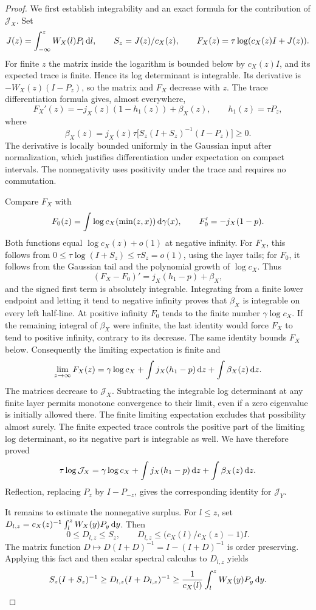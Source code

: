 \begin{proof}
We first establish integrability and an exact formula for the contribution of $\mathcal{J}_X$. Set
\[
J(z)=\int_{-\infty}^zW_X(l)P_l\,\mathrm{d} l,\qquad
S_z=J(z)/c_X(z),\qquad F_X(z)=\tau\log(c_X(z)I+J(z)).
\]
For finite $z$ the matrix inside the logarithm is bounded below by $c_X(z)I$, and its expected trace is finite. Hence its log determinant is integrable. Its derivative is $-W_X(z)(I-P_z)$, so the matrix and $F_X$ decrease with $z$. The trace differentiation formula gives, almost everywhere,
\[
F_X'(z)=-j_X(z)(1-h_1(z))+\beta_X(z),\qquad
h_1(z)=\tau P_z,
\]
where
\[
\beta_X(z)=j_X(z)\tau\bigl[S_z(I+S_z)^{-1}(I-P_z)\bigr]\ge0.
\]
The derivative is locally bounded uniformly in the Gaussian input after normalization, which justifies differentiation under expectation on compact intervals. The nonnegativity uses positivity under the trace and requires no commutation.

Compare $F_X$ with
\[
F_0(z)=\int\log c_X(\min(z,x))\,\mathrm{d} \gamma(x),\qquad
F_0'=-j_X(1-p).
\]
Both functions equal $\log c_X(z)+o(1)$ at negative infinity. For $F_X$, this follows from $0\le\tau\log(I+S_z)\le\tau S_z=o(1)$, using the layer tails; for $F_0$, it follows from the Gaussian tail and the polynomial growth of $\log c_X$. Thus
\[
(F_X-F_0)'=j_X(h_1-p)+\beta_X,
\]
and the signed first term is absolutely integrable. Integrating from a finite lower endpoint and letting it tend to negative infinity proves that $\beta_X$ is integrable on every left half-line. At positive infinity $F_0$ tends to the finite number $\gamma\log c_X$. If the remaining integral of $\beta_X$ were infinite, the last identity would force $F_X$ to tend to positive infinity, contrary to its decrease. The same identity bounds $F_X$ below. Consequently the limiting expectation is finite and
\[
\lim_{z\to\infty}F_X(z)
=\gamma\log c_X+\int j_X(h_1-p)\,\mathrm{d} z+\int\beta_X(z)\,\mathrm{d} z.
\]
The matrices decrease to $\mathcal{J}_X$. Subtracting the integrable log determinant at any finite layer permits monotone convergence to their limit, even if a zero eigenvalue is initially allowed there. The finite limiting expectation excludes that possibility almost surely. The finite expected trace controls the positive part of the limiting log determinant, so its negative part is integrable as well. We have therefore proved
\[
\tau\log\mathcal{J}_X
=\gamma\log c_X+\int j_X(h_1-p)\,\mathrm{d} z+\int\beta_X(z)\,\mathrm{d} z.
\]
Reflection, replacing $P_z$ by $I-P_{-z}$, gives the corresponding identity for $\mathcal{J}_Y$.

It remains to estimate the nonnegative surplus. For $l\le z$, set $D_{l,z}=c_X(z)^{-1}\int_l^zW_X(y)P_y\,\mathrm{d} y$. Then
\[
0\le D_{l,z}\le S_z,\qquad
D_{l,z}\le\bigl(c_X(l)/c_X(z)-1\bigr)I.
\]
The matrix function $D\mapsto D(I+D)^{-1}=I-(I+D)^{-1}$ is order preserving. Applying this fact and then scalar spectral calculus to $D_{l,z}$ yields
\[
S_z(I+S_z)^{-1}
\ge D_{l,z}(I+D_{l,z})^{-1}
\ge\frac1{c_X(l)}\int_l^zW_X(y)P_y\,\mathrm{d} y.
\]


\end{proof}
